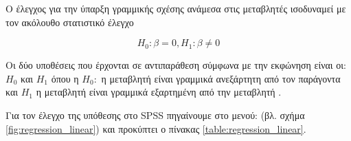 \documentclass{assignment}
\begin{document}
\begin{Assignment}[Μέρος Γ]

Ο έλεγχος για την ύπαρξη γραμμικής σχέσης ανάμεσα στις μεταβλητές ισοδυναμεί με τον ακόλουθο στατιστικό έλεγχο

\begin{equation}
H_0:\beta = 0, H_1: \beta \neq 0
\end{equation}

Οι δύο υποθέσεις που έρχονται σε αντιπαράθεση σύμφωνα με την εκφώνηση είναι οι: $H_0$ και $H_1$ όπου η $H_0:$ η μεταβλητή είναι γραμμικά ανεξάρτητη από τον παράγοντα και $H_1$ η μεταβλητή είναι γραμμικά εξαρτημένη από την μεταβλητή .

Για τον έλεγχο της υπόθεσης στο SPSS πηγαίνουμε στο μενού:  (βλ. σχήμα \ref{fig:regression_linear}) και προκύπτει ο πίνακας \ref{table:regression_linear}. 



\end{Assignment}
\end{document}
